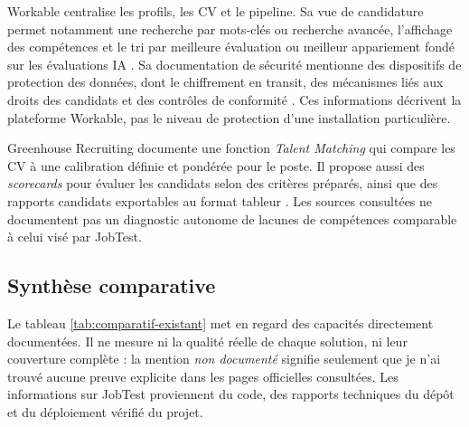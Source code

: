 Workable centralise les profils, les CV et le pipeline. Sa vue de candidature permet notamment une recherche par mots-clés ou recherche avancée, l'affichage des compétences et le tri par meilleure évaluation ou meilleur appariement fondé sur les évaluations IA \cite{workable_pipeline}. Sa documentation de sécurité mentionne des dispositifs de protection des données, dont le chiffrement en transit, des mécanismes liés aux droits des candidats et des contrôles de conformité \cite{workable_security}. Ces informations décrivent la plateforme Workable, pas le niveau de protection d'une installation particulière.

Greenhouse Recruiting documente une fonction \emph{Talent Matching} qui compare les CV à une calibration définie et pondérée pour le poste. Il propose aussi des \textit{scorecards} pour évaluer les candidats selon des critères préparés, ainsi que des rapports candidats exportables au format tableur \cite{greenhouse_ai,greenhouse_scorecards,greenhouse_reports}. Les sources consultées ne documentent pas un diagnostic autonome de lacunes de compétences comparable à celui visé par JobTest.

\subsection{Synthèse comparative}
Le tableau \ref{tab:comparatif-existant} met en regard des capacités directement documentées. Il ne mesure ni la qualité réelle de chaque solution, ni leur couverture complète : la mention \emph{non documenté} signifie seulement que je n'ai trouvé aucune preuve explicite dans les pages officielles consultées. Les informations sur JobTest proviennent du code, des rapports techniques du dépôt et du déploiement vérifié du projet.

